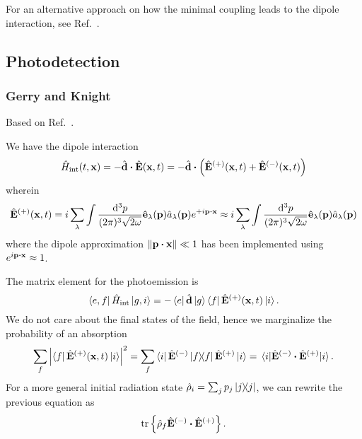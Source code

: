 For an alternative approach on how the minimal coupling leads to the dipole interaction, see Ref.~\cite[p.~635]{Cohen1992}.

\subsection{Photodetection}

\subsubsection{Gerry and Knight}

Based on Ref.~\cite[p.~120]{Gerry2005}.

We have the dipole interaction
\begin{equation}
	\hat{H}_\text{int}(t,\vb{x})
	=
	-
	\hat{\vb{d}}
	\vdot
	\hat{\vb{E}}(\vb{x},t)
	=
	-
	\hat{\vb{d}}
	\vdot
	\left(
		\hat{\vb{E}}^{(+)}(\vb{x},t)
		+
		\hat{\vb{E}}^{(-)}(\vb{x},t)
	\right)
\end{equation}
wherein
\begin{equation}
	\hat{\vb{E}}^{(+)}(\vb{x},t)
	=
	i\sum_\lambda
	\int\frac{\dd[3]{p}}{(2\pi)^3\sqrt{2\omega}}
	\vu{e}_\lambda(\vb{p})
	\hat{a}_\lambda(\vb{p})
	e^{+i\vb{p}\vdot\vb{x}}
	\approx
	i\sum_\lambda
	\int\frac{\dd[3]{p}}{(2\pi)^3\sqrt{2\omega}}
	\vu{e}_\lambda(\vb{p})
	\hat{a}_\lambda(\vb{p})
\end{equation}
where the dipole approximation $\norm{\vb{p}\vdot\vb{x}}\ll1$ has been implemented using $e^{i\vb{p}\vdot\vb{x}}\approx1$.

The matrix element for the photoemission is
\begin{equation}
	\bra{e,f}\hat{H}_\text{int}\ket{g,i}
	=
	-
	\bra{e}\hat{\vb{d}}\ket{g}
	\bra{f}\hat{\vb{E}}^{(+)}(\vb{x},t)\ket{i}
	.
\end{equation}
We do not care about the final states of the field, hence we marginalize the probability of an absorption
\begin{equation}
	\sum_f\abs{\bra{f}\hat{\vb{E}}^{(+)}(\vb{x},t)\ket{i}}^2
	=
	\sum_f
	\bra{i}
	\hat{\vb{E}}^{(-)}
	\ketbra{f}
	\hat{\vb{E}}^{(+)}
	\ket{i}
	=
	\expval{\hat{\vb{E}}^{(-)}\vdot\hat{\vb{E}}^{(+)}}{i}
	.
\end{equation}
For a more general initial radiation state $\hat\rho_i=\sum_jp_j\ketbra{j}$, we can rewrite the previous equation as
\begin{equation}
	\tr\left\{
		\hat\rho_f
		\hat{\vb{E}}^{(-)}
		\vdot
		\hat{\vb{E}}^{(+)}
	\right\}
	.
\end{equation}

